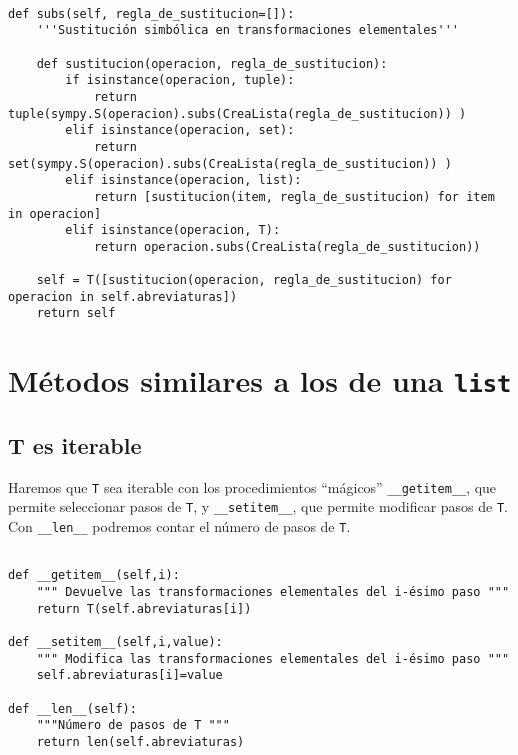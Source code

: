 \documentclass[11pt]{report}
\begin{document}
\begin{verbatim}

def subs(self, regla_de_sustitucion=[]):
    '''Sustitución simbólica en transformaciones elementales'''
    
    def sustitucion(operacion, regla_de_sustitucion):
        if isinstance(operacion, tuple):
            return tuple(sympy.S(operacion).subs(CreaLista(regla_de_sustitucion)) )
        elif isinstance(operacion, set):
            return set(sympy.S(operacion).subs(CreaLista(regla_de_sustitucion)) )
        elif isinstance(operacion, list):
            return [sustitucion(item, regla_de_sustitucion) for item in operacion] 
        elif isinstance(operacion, T):
            return operacion.subs(CreaLista(regla_de_sustitucion)) 
        
    self = T([sustitucion(operacion, regla_de_sustitucion) for operacion in self.abreviaturas])
    return self

\end{verbatim}

\section{Métodos similares a los de una \texttt{list}}
\label{sec:orgbcaa0ee}
\subsection{T es iterable}
\label{sec:orgc4ce80d}

Haremos que \texttt{T} sea iterable con los procedimientos ``mágicos'' \texttt{\_\_getitem\_\_}, que permite seleccionar pasos de \texttt{T}, y 
\texttt{\_\_setitem\_\_}, que permite modificar pasos de \texttt{T}. Con \texttt{\_\_len\_\_}
podremos contar el número de pasos de \texttt{T}.

\begin{verbatim}

def __getitem__(self,i):
    """ Devuelve las transformaciones elementales del i-ésimo paso """
    return T(self.abreviaturas[i])

def __setitem__(self,i,value):
    """ Modifica las transformaciones elementales del i-ésimo paso """
    self.abreviaturas[i]=value
        
def __len__(self):
    """Número de pasos de T """
    return len(self.abreviaturas)

\end{verbatim}
\end{document}
